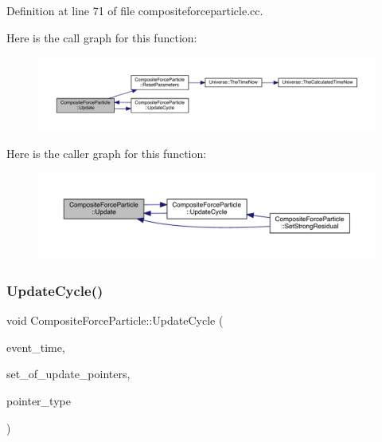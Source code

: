 Definition at line 71 of file compositeforceparticle.\+cc.

Here is the call graph for this function\+:
\nopagebreak
\begin{figure}[H]
\begin{center}
\leavevmode
\includegraphics[width=350pt]{class_composite_force_particle_a69b47aaf17ab6faa396c2f6e6c85b2e3_cgraph}
\end{center}
\end{figure}
Here is the caller graph for this function\+:
\nopagebreak
\begin{figure}[H]
\begin{center}
\leavevmode
\includegraphics[width=350pt]{class_composite_force_particle_a69b47aaf17ab6faa396c2f6e6c85b2e3_icgraph}
\end{center}
\end{figure}
\mbox{\label{class_composite_force_particle_a578d87e48246ef83f39dce070dff541e}} 
\subsubsection{\texorpdfstring{Update\+Cycle()}{UpdateCycle()}}
{\footnotesize\ttfamily void Composite\+Force\+Particle\+::\+Update\+Cycle (\begin{DoxyParamCaption}\item[{std\+::chrono\+::time\+\_\+point$<$ \hyperlink{universe_8h_a0ef8d951d1ca5ab3cfaf7ab4c7a6fd80}{Clock} $>$}]{event\+\_\+time,  }\item[{std\+::vector$<$ \hyperlink{class_composite_force_particle}{Composite\+Force\+Particle} $\ast$$>$}]{set\+\_\+of\+\_\+update\+\_\+pointers,  }\item[{unsigned int}]{pointer\+\_\+type }\end{DoxyParamCaption})}



